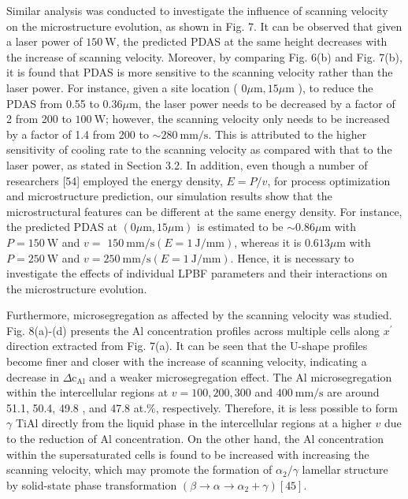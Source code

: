 \documentclass[10pt]{article}
\begin{document}
Similar analysis was conducted to investigate the influence of scanning velocity on the microstructure evolution, as shown in Fig. 7. It can be observed that given a laser power of $150 \mathrm{~W}$, the predicted PDAS at the same height decreases with the increase of scanning velocity. Moreover, by comparing Fig. 6(b) and Fig. 7(b), it is found that PDAS is more sensitive to the scanning velocity rather than the laser power. For instance, given a site location ( $0 \mu \mathrm{m}, 15 \mu \mathrm{m}$ ), to reduce the PDAS from 0.55 to $0.36 \mu \mathrm{m}$, the laser power needs to be decreased by a factor of 2 from 200 to $100 \mathrm{~W}$; however, the scanning velocity only needs to be increased by a factor of 1.4 from 200 to $\sim 280 \mathrm{~mm} / \mathrm{s}$. This is attributed to the higher sensitivity of cooling rate to the scanning velocity as compared with that to the laser power, as stated in Section 3.2. In addition, even though a number of researchers [54] employed the energy density, $E=P / v$, for process optimization and microstructure prediction, our simulation results show that the microstructural features can be different at the same energy density. For instance, the predicted PDAS at $(0 \mu \mathrm{m}, 15 \mu \mathrm{m})$ is estimated to be $\sim 0.86 \mu \mathrm{m}$ with $P=150 \mathrm{~W}$ and $v=$ $150 \mathrm{~mm} / \mathrm{s}(E=1 \mathrm{~J} / \mathrm{mm})$, whereas it is $0.613 \mu \mathrm{m}$ with $P=250 \mathrm{~W}$ and $v=250 \mathrm{~mm} / \mathrm{s}(E=1 \mathrm{~J} / \mathrm{mm})$. Hence, it is necessary to investigate the effects of individual LPBF parameters and their interactions on the microstructure evolution.

Furthermore, microsegregation as affected by the scanning velocity was studied. Fig. 8(a)-(d) presents the Al concentration profiles across multiple cells along $x^{\prime}$ direction extracted from Fig. 7(a). It can be seen that the U-shape profiles become finer and closer with the increase of scanning velocity, indicating a decrease in $\Delta \mathrm{c}_{\mathrm{Al}}$ and a weaker microsegregation effect. The $\mathrm{Al}$ microsegregation within the intercellular regions at $v=100,200,300$ and $400 \mathrm{~mm} / \mathrm{s}$ are around 51.1, 50.4, 49.8 , and 47.8 at.\%, respectively. Therefore, it is less possible to form $\gamma$ TiAl directly from the liquid phase in the intercellular regions at a higher $v$ due to the reduction of $\mathrm{Al}$ concentration. On the other hand, the Al concentration within the supersaturated cells is found to be increased with increasing the scanning velocity, which may promote the formation of $\alpha_{2} / \gamma$ lamellar structure by solid-state phase transformation $\left(\beta \rightarrow \alpha \rightarrow \alpha_{2}+\gamma\right)[45]$.
\end{document}
